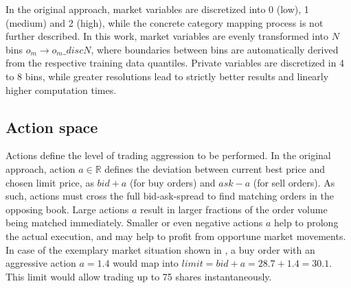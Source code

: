 In the original approach, market variables are discretized into 0 (low), 1 (medium) and 2 (high), while the concrete category mapping process is not further described. In this work, market variables are evenly transformed into $N$ bins $o_m \rightarrow o_m\_discN$, where boundaries between bins are automatically derived from the respective training data quantiles. Private variables are discretized in 4 to 8 bins, while greater resolutions lead to strictly better results and linearly higher computation times.


\subsection{Action space}
\label{chap:actionspace}
Actions define the level of trading aggression to be performed. In the original approach, action $a \in \mathbb{R}$ defines the deviation between current best price and chosen limit price, as $bid + a$ (for buy orders) and $ask - a$ (for sell orders). As such, actions must cross the full bid-ask-spread to find matching orders in the opposing book. Large actions $a$ result in larger fractions of the order volume being matched immediately. Smaller or even negative actions $a$ help to prolong the actual execution, and may help to profit from opportune market movements.\\

In case of the exemplary market situation shown in , a buy order with an aggressive action $a=1.4$ would map into $limit=bid+a=28.7+1.4=30.1$. This limit would allow trading up to 75 shares instantaneously.\\

\begin{table}
\centering
\caption{Action $a=1.4$ translates into $limit=28.7 + 1.4 = 30.1$.}
\label{table:orderbook:example:again}
\end{table}

